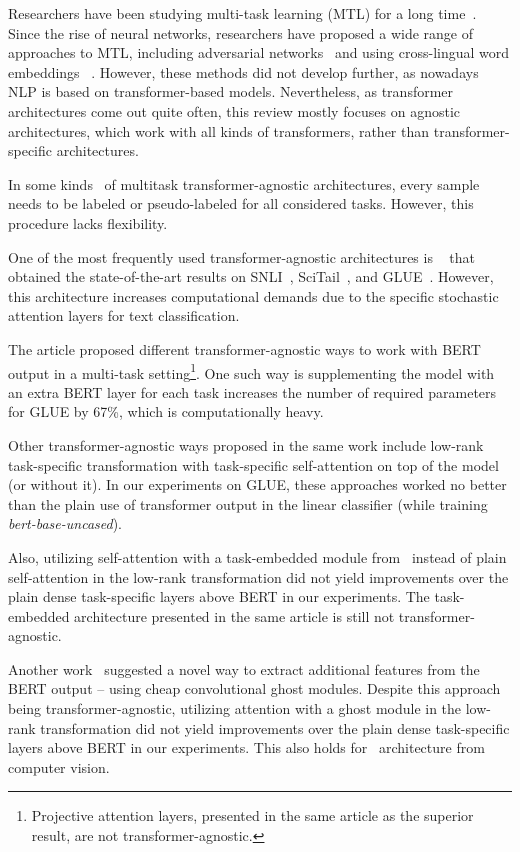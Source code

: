 Researchers have been studying multi-task learning (MTL) for a long time~\cite{caruana1997multi-task}. Since the rise of neural networks, researchers have proposed a wide range of approaches to MTL, including adversarial networks~\cite{wang-etal-2018-personalized} and using cross-lingual word embeddings~\cite{buryat} . However, these methods did not develop further, as nowadays NLP is based on transformer-based models. Nevertheless, as transformer architectures come out quite often, this review mostly focuses on agnostic architectures, which work with all kinds of transformers, rather than transformer-specific architectures.

In some kinds~\cite{pseudolabeling} of multitask transformer-agnostic architectures, every sample needs to be labeled or pseudo-labeled for all considered tasks. However, this procedure lacks flexibility.

One of the most frequently used transformer-agnostic architectures is ~\cite{MTDNN:19} that obtained the state-of-the-art results on SNLI~\cite{snli}, SciTail~\cite{khot2018scitail}, and GLUE~\cite{GLUE:19}. However, this architecture increases computational demands due to the specific stochastic attention layers for text classification.

The article \cite{PAL:19} proposed different transformer-agnostic ways to work with BERT output in a multi-task setting\footnote{Projective attention layers, presented in the same article as the superior result, are not transformer-agnostic.}. One such way is supplementing the model with an extra BERT layer for each task increases the number of required parameters for GLUE by 67\%, which is computationally heavy. 

Other transformer-agnostic ways proposed in the same work include low-rank task-specific transformation with task-specific self-attention on top of the model (or without it). In our experiments on GLUE, these approaches worked no better than the plain use of transformer output in the linear classifier (while training \textit{bert-base-uncased}).

 Also, utilizing self-attention with a task-embedded module from~\cite{TaskEmbedded2021} instead of plain self-attention in the low-rank transformation did not yield improvements over the plain dense task-specific layers above BERT in our experiments. The task-embedded architecture presented in the same article is still not transformer-agnostic.

Another work~\cite{GhostBert2021} suggested a novel way to extract additional features from the BERT output -- using cheap convolutional ghost modules. Despite this approach being transformer-agnostic, utilizing attention with a ghost module in the low-rank transformation did not yield improvements over the plain dense task-specific layers above BERT in our experiments. This also holds for~\cite{el-nouby2021xcit} architecture from computer vision.

